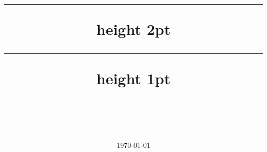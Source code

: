 \title{
    \vspace{-2cm}
    \hrule  height 2pt \relax
    \vspace{.5cm}
    {\color{DarkRed}
    \heiti{\huge \mytitle}\\
    \mysubtitle
    }
    \vspace{.5cm}
    \hrule height 1pt \relax
    }

\author{\name\\
    \sno\\
    \institution\\
    \color{DarkRed}
    \href{mailto:\email}{\selectfont\email}
    }

\date{\today}
